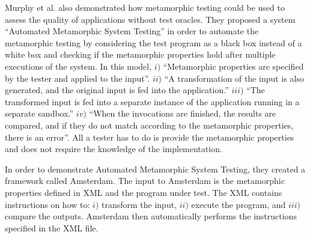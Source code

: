 	
Murphy et al. \cite{Murphy2009} also demonstrated how metamorphic testing could be used to assess the quality of applications without test oracles.  They proposed a system ``Automated Metamorphic System Testing'' in order to automate the metamorphic testing by considering the test program as a black box instead of a white box and checking if the metamorphic properties hold after multiple executions of the system. In this model, $i)$ \enquote{Metamorphic properties are specified by the tester and applied to the input}. $ii)$ \enquote{A transformation of the input is also generated, and the original input is fed into the application.} $iii)$ \enquote{The transformed input is fed into a separate instance of the application running in a separate sandbox.} $iv)$ \enquote{When the invocations are finished, the results are compared, and if they do not match according to the metamorphic properties, there is an error}. All a tester has to do is provide the metamorphic properties and does not require the knowledge of the implementation.

In order to demonstrate Automated Metamorphic System Testing, they created a framework called Amsterdam. The input to Amsterdam is the metamorphic properties defined in XML and the program under test. The XML contains instructions on how to: $i)$ transform the input, $ii)$ execute the program, and $iii)$ compare the outputs. Amsterdam then automatically performs the instructions specified in the XML file.

